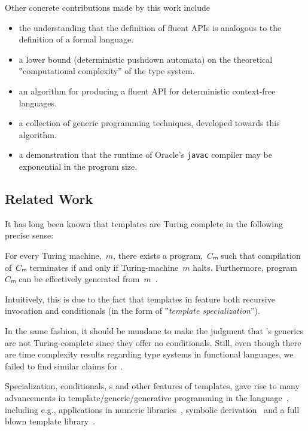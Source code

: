 Other concrete contributions made by this work include
\begin{itemize}
  \item the understanding that the definition of fluent APIs is analogous to
        the definition of a formal language.
  \item a lower bound (deterministic pushdown automata)
        on the theoretical ‟computational complexity” of the \Java type system.
  \item an algorithm for producing a fluent API for deterministic context-free
        languages.
  \item a collection of generic programming techniques, developed towards this
        algorithm.
  \item a demonstration that the runtime of Oracle's \texttt{javac} compiler
        may be exponential in the program size.
\end{itemize}

\subsection{Related Work}

It has long been known
that \CC templates are Turing complete in the following precise sense:

\begin{Proposition}
  \label{theorem:Gutterman}
  For every Turing machine,~$m$, there exists a \CC program,~$Cₘ$ such that
  compilation of~$Cₘ$ terminates if and only if
  Turing-machine~$m$ halts.
  Furthermore, program~$Cₘ$ can be effectively generated
  from~$m$~\cite{Gutterman:2003}.
\end{Proposition}

Intuitively, this is due to the fact that templates in \CC
feature both recursive invocation and conditionals (in the form of
‟\emph{template specialization}”).

In the same fashion, it should be mundane to make the judgment that \Java's
generics are not Turing-complete since they offer no conditionals. Still, even
though there are time complexity results regarding type systems in functional
languages, we failed to find similar claims for \Java.

Specialization, conditionals, s and other features of \CC
templates, gave rise to many advancements in template/generic/generative
programming in the language~\cite{Austern:1998,Musser:Stepanov:1989,
Backhouse:Jansson:1999, Dehnert:Stepanov:2000}, including e.g., applications in
numeric libraries~\cite{Veldhuizen:95,Vandevoorde:Josuttis:02}, symbolic
derivation~\cite{Gil:Gutterman:98} and a full blown template
library~\cite{Abrahams:Gurtovoy:04}.

